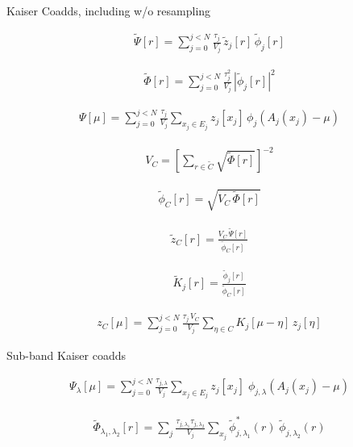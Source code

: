 \documentclass{amsart}
\begin{document}
Kaiser Coadds, including w/o resampling

\begin{align}
\widetilde{\Psi}[r] =
\sum_{j=0}^{j<N}
\frac{\tau_j}{V_j}
\,
\widetilde{z}_j[r]
\,
\widetilde{\phi}_j[r]
\end{align}

\begin{align}
\widetilde{\Phi}[r]
=
\sum_{j=0}^{j<N}
\frac{\tau_j^2}{V_j}
\,
\left|
\widetilde{\phi}_j[r]
\right|^2
\end{align}

\begin{align}
\Psi[\mu] =
\sum_{j=0}^{j<N}
\frac{\tau_j}{V_j}
\sum_{x_j \in E_j}
z_j[x_j]
\,
\phi_j(A_j(x_j) - \mu)
\end{align}

\begin{align}
V_C = \left[
  \sum_{r \in \widetilde{C}}
  \sqrt{\widetilde{\Phi}[r]}
\right]^{-2}
\end{align}

\begin{align}
\widetilde{\phi}_C[r] =
\sqrt{V_C \, \widetilde{\Phi}[r]}
\end{align}

\begin{align}
\widetilde{z}_C[r] =
\frac{
  V_C \, \widetilde{\Psi}[r]
}{
  \widetilde{\phi}_C[r]
}
\end{align}

\begin{align}
\widetilde{K}_j[r] =
\frac{
  \widetilde{\phi}_j[r]
}{
  \widetilde{\phi}_C[r]
}
\end{align}

\begin{align}
z_C[\mu] = \sum_{j=0}^{j<N}
  \frac{\tau_j\,V_C}{V_j}
  \sum_{\eta \in C}
  K_j[\mu - \eta]
  \,
  z_j[\eta]
\end{align}


Sub-band Kaiser coadds

\begin{align}
\Psi_{\lambda}[\mu] =
    \sum_{j=0}^{j < N}
    \frac{\tau_{j,\lambda}}{V_j}
    \sum_{x_j \in E_j}
    z_j[x_j]
    \; \phi_{j,\lambda}\!\left(
        A_j(x_j) - \mu
    \right)
\end{align}

\begin{align}
\widetilde{\Phi}_{\lambda_1,\lambda_2}[r] =
    \sum_{j}
    \frac{
        \tau_{j,\lambda_1}
        \tau_{j,\lambda_2}
    }{
        V_j
    }
    \sum_{x_j}
    \widetilde{\phi}^*_{j,\lambda_1}\!(r)
    \;
    \widetilde{\phi}_{j,\lambda_2}\!(r)
\end{align}
\end{document}
